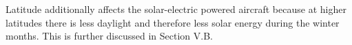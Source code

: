 Latitude additionally affects the solar-electric powered aircraft because at higher latitudes there is less daylight and therefore less solar energy during the winter months. This is further discussed in Section V.B.

% 
% 
% 
% 


